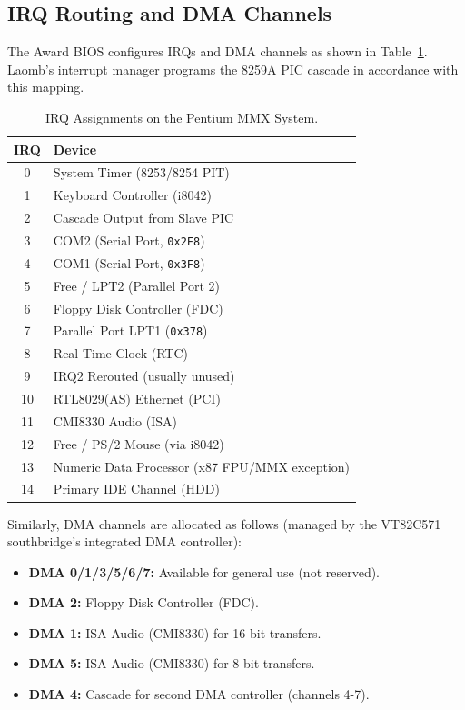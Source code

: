\documentclass[12pt,a4paper]{report}
\begin{document}
	\subsection{IRQ Routing and DMA Channels}
	\label{sec:irq-routing}
	
	The Award BIOS configures IRQs and DMA channels as shown in Table~\ref{tab:irq-mapping}. Laomb's interrupt manager programs the 8259A PIC cascade in accordance with this mapping.
	
	\begin{table}[ht]
		\centering
		\begin{tabular}{c p{8cm}}
			\toprule
			\textbf{IRQ} & \textbf{Device} \\
			\midrule
			0   & System Timer (8253/8254 PIT) \\
			1   & Keyboard Controller (i8042) \\
			2   & Cascade Output from Slave PIC \\
			3   & COM2 (Serial Port, \texttt{0x2F8}) \\
			4   & COM1 (Serial Port, \texttt{0x3F8}) \\
			5   & Free / LPT2 (Parallel Port 2) \\
			6   & Floppy Disk Controller (FDC) \\
			7   & Parallel Port LPT1 (\texttt{0x378}) \\
			8   & Real-Time Clock (RTC) \\
			9   & IRQ2 Rerouted (usually unused) \\
			10  & RTL8029(AS) Ethernet (PCI) \\
			11  & CMI8330 Audio (ISA) \\
			12  & Free / PS/2 Mouse (via i8042) \\
			13  & Numeric Data Processor (x87 FPU/MMX exception) \\
			14  & Primary IDE Channel (HDD) \\
			\bottomrule
		\end{tabular}
		\caption{IRQ Assignments on the Pentium MMX System.}
		\label{tab:irq-mapping}
	\end{table}
	
	Similarly, DMA channels are allocated as follows (managed by the VT82C571 southbridge's integrated DMA controller):
	
	\begin{itemize}
		\item \textbf{DMA 0/1/3/5/6/7:} Available for general use (not reserved).
		\item \textbf{DMA 2:} Floppy Disk Controller (FDC).
		\item \textbf{DMA 1:} ISA Audio (CMI8330) for 16-bit transfers.
		\item \textbf{DMA 5:} ISA Audio (CMI8330) for 8-bit transfers.
		\item \textbf{DMA 4:} Cascade for second DMA controller (channels 4-7).
	\end{itemize}
	
\end{document}
